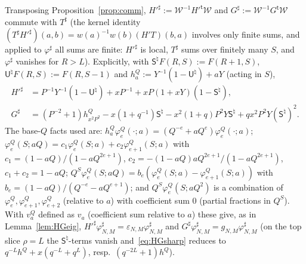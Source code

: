 \documentclass[11pt]{amsart}
\theoremstyle{definition}
\numberwithin{equation}{section}
\begin{document}
Transposing Proposition~\ref{prop:comm}, $H'^\sharp:=\mathcal W^{-1}H'^{\mathsf t}\mathcal W$ and
$G^\sharp:=\mathcal W^{-1}G^{\mathsf t}\mathcal W$ commute with $T^\sharp$ (the kernel identity
$(T^\sharp H'^\sharp)(a,b)=w(a)^{-1}w(b)(H'T)(b,a)$ involves only finite sums, and applied to $\varphi^\sharp$ all sums are
finite: $H'^\sharp$ is local, $T^\sharp$ sums over finitely many $S$, and $\varphi^\sharp$ vanishes for $R>L$). Explicitly,
with $\mathsf S^\natural F(R,S):=F(R+1,S)$, $\mathsf U^\natural F(R,S):=F(R,S-1)$ and $h^Q_a:=Y^{-1}(1-\mathsf U^\natural)+aY$ (acting
in $S$),
\begin{equation}\label{eq:HGsharp}
\begin{aligned}
H'^\sharp&=P^{-1}Y^{-1}(1-\mathsf U^\natural)+xP^{-1}+xP(1+xY)(1-\mathsf S^\natural),\\
G^\sharp&=(P^{-2}+1)h^Q_{x^2P^2}-x(1+q^{-1})\mathsf S^\natural-x^2(1+q)P^2Y\mathsf S^\natural+qx^2P^2Y(\mathsf S^\natural)^2 .
\end{aligned}
\end{equation}
The base-$Q$ facts used are: $h^Q_a\varphi^Q_e(\cdot;a)=(Q^{-e}+aQ^e)\varphi^Q_e(\cdot;a)$;
$\varphi^Q_e(S;aQ)=c_1\varphi^Q_e(S;a)+c_2\varphi^Q_{e+1}(S;a)$ with $c_1=(1-aQ)/(1-aQ^{2e+1})$,
$c_2=-(1-aQ)aQ^{2e+1}/(1-aQ^{2e+1})$, $c_1+c_2=1-aQ$; $Q^S\varphi^Q_e(S;aQ)=b_e(\varphi^Q_e(S;a)-\varphi^Q_{e+1}(S;a))$ with
$b_e=(1-aQ)/(Q^{-e}-aQ^{e+1})$; and $Q^S\varphi^Q_e(S;aQ^2)$ is a combination of $\varphi^Q_e,\varphi^Q_{e+1},\varphi^Q_{e+2}$
(relative to $a$) with coefficient sum $0$ (partial fractions in $Q^S$). With $v^Q_a$ defined as $v_a$ (coefficient
sum relative to $a$) these give, as in Lemma~\ref{lem:HGeig}, $H'^\sharp\varphi^\sharp_{N,M}=\varepsilon_{N,M}\varphi^\sharp_{N,M}$ and
$G^\sharp\varphi^\sharp_{N,M}=g_{N,M}\varphi^\sharp_{N,M}$ (on the top slice $\rho=L$ the $\mathsf S^\natural$-terms vanish
and~\eqref{eq:HGsharp} reduces to $q^{-L}h^Q+x(q^{-L}+q^L)$, resp.\ $(q^{-2L}+1)h^Q$).
\end{document}
